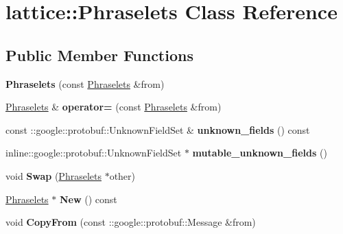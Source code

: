 \hypertarget{classlattice_1_1Phraselets}{
\section{lattice::Phraselets Class Reference}
\label{classlattice_1_1Phraselets}
}
\subsection*{Public Member Functions}
\begin{DoxyCompactItemize}
\item 
\hypertarget{classlattice_1_1Phraselets_ab7dd94e765222f9afd3ddc6aae28f4b9}{
{\bfseries Phraselets} (const \hyperlink{classlattice_1_1Phraselets}{Phraselets} \&from)}
\label{classlattice_1_1Phraselets_ab7dd94e765222f9afd3ddc6aae28f4b9}

\item 
\hypertarget{classlattice_1_1Phraselets_ab7fc4048a36fb485457156b33d201f0f}{
\hyperlink{classlattice_1_1Phraselets}{Phraselets} \& {\bfseries operator=} (const \hyperlink{classlattice_1_1Phraselets}{Phraselets} \&from)}
\label{classlattice_1_1Phraselets_ab7fc4048a36fb485457156b33d201f0f}

\item 
\hypertarget{classlattice_1_1Phraselets_a2139960d920a5bc3aa8b93eee034a5f3}{
const ::google::protobuf::UnknownFieldSet \& {\bfseries unknown\_\-fields} () const }
\label{classlattice_1_1Phraselets_a2139960d920a5bc3aa8b93eee034a5f3}

\item 
\hypertarget{classlattice_1_1Phraselets_a30f7480fb64d1b726d53ee8bea076b72}{
inline::google::protobuf::UnknownFieldSet $\ast$ {\bfseries mutable\_\-unknown\_\-fields} ()}
\label{classlattice_1_1Phraselets_a30f7480fb64d1b726d53ee8bea076b72}

\item 
\hypertarget{classlattice_1_1Phraselets_af2b24704a495960845fe4e4c2188a53f}{
void {\bfseries Swap} (\hyperlink{classlattice_1_1Phraselets}{Phraselets} $\ast$other)}
\label{classlattice_1_1Phraselets_af2b24704a495960845fe4e4c2188a53f}

\item 
\hypertarget{classlattice_1_1Phraselets_a8229047c413dbe2af7836e10c8b4c0d4}{
\hyperlink{classlattice_1_1Phraselets}{Phraselets} $\ast$ {\bfseries New} () const }
\label{classlattice_1_1Phraselets_a8229047c413dbe2af7836e10c8b4c0d4}

\item 
\hypertarget{classlattice_1_1Phraselets_ae545b608108f883959885ca212ba9c47}{
void {\bfseries CopyFrom} (const ::google::protobuf::Message \&from)}
\label{classlattice_1_1Phraselets_ae545b608108f883959885ca212ba9c47}


\end{DoxyCompactItemize}
